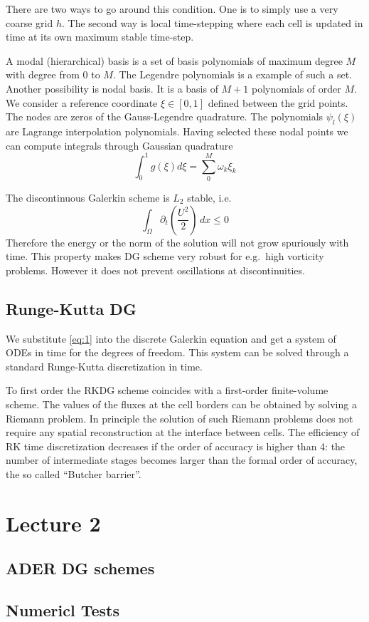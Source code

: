\documentclass[letterpaper, 11pt]{article}
\numberwithin{equation}{section}
\numberwithin{figure}{section}
\begin{document}
There are two ways to go around this condition. One is to simply use a very
coarse grid $h$. The second way is local time-stepping where each cell is
updated in time at its own maximum stable time-step.

A modal (hierarchical) basis is a set of basis polynomials of maximum degree $M$
with degree from 0 to $M$. The Legendre polynomials is a example of such a set.
Another possibility is nodal basis. It is a basis of $M + 1$ polynomials of
order $M$. We consider a reference coordinate $\xi\in [0, 1]$ defined between
the grid points. The nodes are zeros of the Gauss-Legendre quadrature. The
polynomials $\psi_l(\xi)$ are Lagrange interpolation polynomials. Having
selected these nodal points we can compute integrals through Gaussian quadrature
\begin{equation}
  \label{eq:7}
  \int_0^1g(\xi)d\xi = \sum_0^M\omega_k\xi_k
\end{equation}

The discontinuous Galerkin scheme is $L_2$ stable, i.e.\
\begin{equation}
  \label{eq:8}
  \int_{\Omega} \partial_t \left( \frac{U^2}{2} \right)\,dx \leq 0
\end{equation}
Therefore the energy or the norm of the solution will not grow spuriously with
time. This property makes DG scheme very robust for e.g.\ high vorticity
problems. However it does not prevent oscillations at discontinuities.

\subsection{Runge-Kutta DG}

We substitute \eqref{eq:1} into the discrete Galerkin equation and get a system
of ODEs in time for the degrees of freedom. This system can be solved through a
standard Runge-Kutta discretization in time.

To first order the RKDG scheme coincides with a first-order finite-volume
scheme. The values of the fluxes at the cell borders can be obtained by solving
a Riemann problem. In principle the solution of such Riemann problems does not
require any spatial reconstruction at the interface between cells. The
efficiency of RK time discretization decreases if the order of accuracy is
higher than 4: the number of intermediate stages becomes larger than the formal
order of accuracy, the so called ``Butcher barrier''.

\section{Lecture 2}

\subsection{ADER DG schemes}

\subsection{Numericl Tests}
\end{document}
